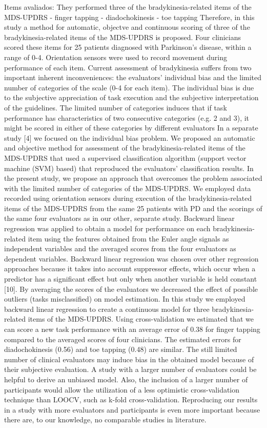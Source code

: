 Items avaliados:
They performed three of the bradykinesia-related items of the MDS-UPDRS 
 - finger tapping
 - diadochokinesis
 - toe tapping
Therefore, in this study a method for automatic, objectve and continuous scoring of three of the bradykinesia-related items of the MDS-UPDRS is proposed. Four clinicians scored these items for 25 patients diagnosed with Parkinson’s disease, within a range of 0-4. Orientation sensors were used to record movement during performance of each item.
Current assessment of bradykinesia suffers from two important inherent inconveniences: the evaluators’ individual bias and the limited number of categories of the scale (0-4 for each item). The individual bias is due to the subjective appreciation of task execution and the subjective interpretation of the guidelines. The limited number of categories induces that if task performance has characteristics of two consecutive categories (e.g. 2 and 3), it might be scored in either of these categories by different evaluators
In a separate study [4] we focused on the individual bias problem. We proposed an automatic and objective method for assessment of the bradykinesia-related items of the MDS-UPDRS that used a supervised classification algorithm (support vector machine (SVM) based) that reproduced the evaluators’ classification results.
In the present study, we propose an approach that overcomes the problem associated with the limited number of categories of the MDS-UPDRS. We employed data recorded using orientation sensors during execution of the bradykinesia-related items of the MDS-UPDRS from the same 25 patients with PD and the scorings of the same four evaluators as in our other, separate study.
Backward linear regression was applied to obtain a model for performance on each bradykinesia-related item using the features obtained from the Euler angle signals as independent variables and the averaged scores from the four evaluators as dependent variables. Backward linear regression was chosen over other regression approaches because it takes into account suppressor effects, which occur when a predictor has a significant effect but only when another variable is held constant [10]. By averaging the scores of the evaluators we decreased the effect of possible outliers (tasks misclassified) on model estimation.
In this study we employed backward linear regression to create a continuous model for three bradykinesia-related items of the MDS-UPDRS. Using cross-validation we estimated that we can score a new task performance with an average error of 0.38 for finger tapping compared to the averaged scores of four clinicians. The estimated errors for diadochokinesis (0.56) and toe tapping (0.48) are similar. The still limited number of clinical evaluators may induce bias in the obtained model because of their subjective evaluation. A study with a larger number of evaluators could be helpful to derive an unbiased model. Also, the inclusion of a larger number of participants would allow the utilization of a less optimistic cross-validation technique than LOOCV, such as k-fold cross-validation. Reproducing our results in a study with more evaluators and participants is even more important because there are, to our knowledge, no comparable studies in literature.
